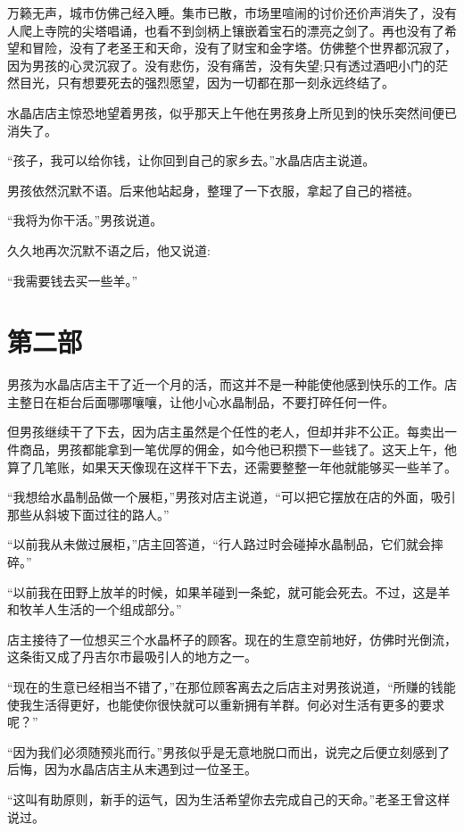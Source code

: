 \documentclass[twoside,openany]{book}
\begin{document}
万籁无声，城市仿佛己经入睡。集市已散，市场里喧闹的讨价还价声消失了，没有人爬上寺院的尖塔唱诵，也看不到剑柄上镶嵌着宝石的漂亮之剑了。再也没有了希望和冒险，没有了老圣王和天命，没有了财宝和金字塔。仿佛整个世界都沉寂了，因为男孩的心灵沉寂了。没有悲伤，没有痛苦，没有失望;只有透过酒吧小门的茫然目光，只有想要死去的强烈愿望，因为一切都在那一刻永远终结了。

水晶店店主惊恐地望着男孩，似乎那天上午他在男孩身上所见到的快乐突然间便已消失了。

“孩子，我可以给你钱，让你回到自己的家乡去。”水晶店店主说道。

男孩依然沉默不语。后来他站起身，整理了一下衣服，拿起了自己的褡裢。

“我将为你干活。”男孩说道。

久久地再次沉默不语之后，他又说道:

“我需要钱去买一些羊。”


\chapter{第二部}\label{ch2}

男孩为水晶店店主干了近一个月的活，而这并不是一种能使他感到快乐的工作。店主整日在柜台后面哪哪嚷嚷，让他小心水晶制品，不要打碎任何一件。

但男孩继续干了下去，因为店主虽然是个任性的老人，但却并非不公正。每卖出一件商品，男孩都能拿到一笔优厚的佣金，如今他已积攒下一些钱了。这天上午，他算了几笔账，如果天天像现在这样干下去，还需要整整一年他就能够买一些羊了。

“我想给水晶制品做一个展柜，”男孩对店主说道，“可以把它摆放在店的外面，吸引那些从斜坡下面过往的路人。”

“以前我从未做过展柜，”店主回答道，“行人路过时会碰掉水晶制品，它们就会摔碎。”

“以前我在田野上放羊的时候，如果羊碰到一条蛇，就可能会死去。不过，这是羊和牧羊人生活的一个组成部分。”

店主接待了一位想买三个水晶杯子的顾客。现在的生意空前地好，仿佛时光倒流，这条街又成了丹吉尔市最吸引人的地方之一。

“现在的生意已经相当不错了，”在那位顾客离去之后店主对男孩说道，“所赚的钱能使我生活得更好，也能使你很快就可以重新拥有羊群。何必对生活有更多的要求呢？”

“因为我们必须随预兆而行。”男孩似乎是无意地脱口而出，说完之后便立刻感到了后悔，因为水晶店店主从末遇到过一位圣王。

“这叫有助原则，新手的运气，因为生活希望你去完成自己的天命。”老圣王曾这样说过。
\end{document}
